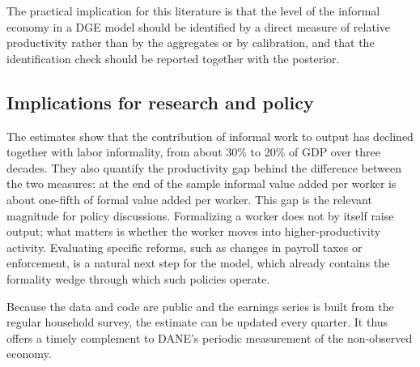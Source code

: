 The practical implication for this literature is that the level of the informal economy in a DGE model should be identified by a direct measure of relative productivity rather than by the aggregates or by calibration, and that the identification check should be reported together with the posterior.

\subsection{Implications for research and policy}

The estimates show that the contribution of informal work to output has declined together with labor informality, from about 30\% to 20\% of GDP over three decades. They also quantify the productivity gap behind the difference between the two measures: at the end of the sample informal value added per worker is about one-fifth of formal value added per worker. This gap is the relevant magnitude for policy discussions. Formalizing a worker does not by itself raise output; what matters is whether the worker moves into higher-productivity activity. Evaluating specific reforms, such as changes in payroll taxes or enforcement, is a natural next step for the model, which already contains the formality wedge through which such policies operate.

Because the data and code are public and the earnings series is built from the regular household survey, the estimate can be updated every quarter. It thus offers a timely complement to DANE's periodic measurement of the non-observed economy.
